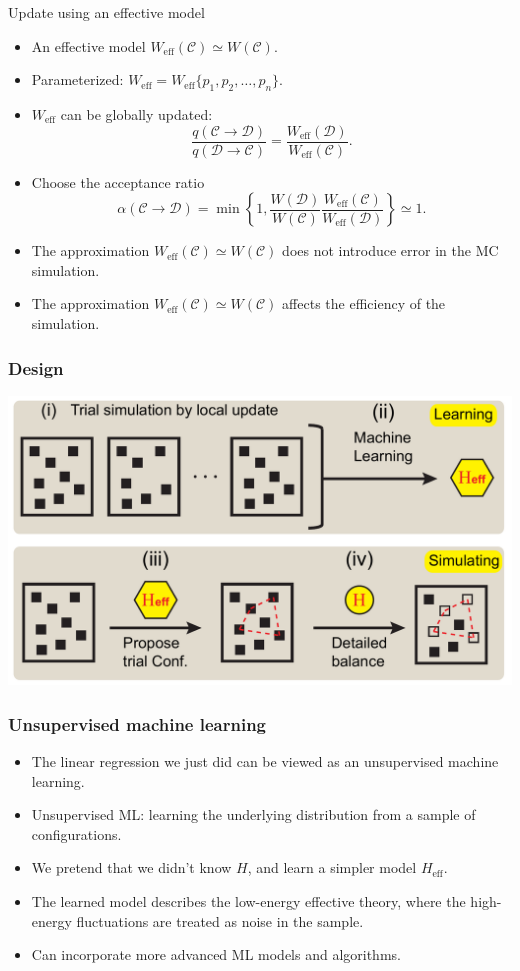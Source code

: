 \documentclass[xcolor=table, 10pt, aspectratio=169]{beamer}
\begin{document}
\begin{frame}{Update using an effective model}
\begin{itemize}
\item An effective model $W_{\text{eff}}(\mathcal C)\simeq W(\mathcal C)$.
\item Parameterized: $W_{\text{eff}}=W_{\text{eff}}\{p_1,p_2,\ldots,p_n\}$.
\item $W_{\text{eff}}$ can be globally updated:
\[\frac{q(\mathcal C\rightarrow\mathcal D)}{q(\mathcal D\rightarrow\mathcal C)}
=\frac{W_{\text{eff}}(\mathcal D)}{W_{\text{eff}}(\mathcal C)}.\]
\item Choose the acceptance ratio
\[\alpha(\mathcal C\rightarrow\mathcal D) =
\min\left\{1, \frac{W(\mathcal D)}{W(\mathcal C)}
\frac{W_{\text{eff}}(\mathcal C)}{W_{\text{eff}}(\mathcal D)}
\right\}\simeq1.\]
\item The approximation $W_{\text{eff}}(\mathcal C)\simeq W(\mathcal C)$ does not introduce error in the MC simulation.
\item The approximation $W_{\text{eff}}(\mathcal C)\simeq W(\mathcal C)$ affects the efficiency of the simulation.
\end{itemize}
\end{frame}

\begin{frame}
  \frametitle{Design}
  \begin{center}
    \includegraphics[width=.8\textwidth]{Fig1}
  \end{center}
\end{frame}

\begin{frame}
  \frametitle{Unsupervised machine learning}
  \begin{itemize}
    \item The linear regression we just did can be viewed as an unsupervised machine learning.
    \item Unsupervised ML: learning the underlying distribution from a sample of configurations.
    \item We pretend that we didn't know $H$, and learn a simpler model $H_{\text{eff}}$.
    \item The learned model describes the low-energy effective theory, where the high-energy fluctuations are treated as noise in the sample.
    \item Can incorporate more advanced ML models and algorithms.
  \end{itemize}
\end{frame}
\end{document}
